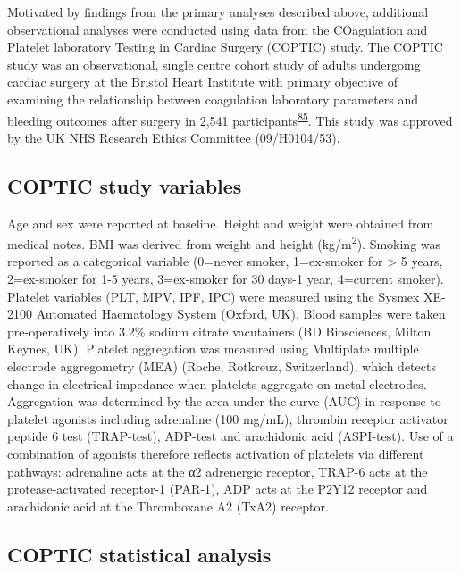 \documentclass[11pt,twoside]{bristolthesis}
\begin{document}
Motivated by findings from the primary analyses described above, additional observational analyses were conducted using data from the COagulation and Platelet laboratory Testing in Cardiac Surgery (COPTIC) study. The COPTIC study was an observational, single centre cohort study of adults undergoing cardiac surgery at the Bristol Heart Institute with primary objective of examining the relationship between coagulation laboratory parameters and bleeding outcomes after surgery in 2,541 participants\textsuperscript{\protect\hyperlink{ref-Mumford2017}{85}}. This study was approved by the UK NHS Research Ethics Committee (09/H0104/53).

\hypertarget{coptic-study-variables}{%
\subsection{COPTIC study variables}\label{coptic-study-variables}}

Age and sex were reported at baseline. Height and weight were obtained from medical notes. BMI was derived from weight and height (kg/m\textsuperscript{2}). Smoking was reported as a categorical variable (0=never smoker, 1=ex-smoker for \textgreater{} 5 years, 2=ex-smoker for 1-5 years, 3=ex-smoker for 30 days-1 year, 4=current smoker). Platelet variables (PLT, MPV, IPF, IPC) were measured using the Sysmex XE-2100 Automated Haematology System (Oxford, UK). Blood samples were taken pre-operatively into 3.2\% sodium citrate vacutainers (BD Biosciences, Milton Keynes, UK). Platelet aggregation was measured using Multiplate multiple electrode aggregometry (MEA) (Roche, Rotkreuz, Switzerland), which detects change in electrical impedance when platelets aggregate on metal electrodes. Aggregation was determined by the area under the curve (AUC) in response to platelet agonists including adrenaline (100 mg/mL), thrombin receptor activator peptide 6 test (TRAP-test), ADP-test and arachidonic acid (ASPI-test). Use of a combination of agonists therefore reflects activation of platelets via different pathways: adrenaline acts at the α2 adrenergic receptor, TRAP-6 acts at the protease-activated receptor-1 (PAR-1), ADP acts at the P2Y12 receptor and arachidonic acid at the Thromboxane A2 (TxA2) receptor.

\hypertarget{coptic-statistical-analysis}{%
\subsection{COPTIC statistical analysis}\label{coptic-statistical-analysis}}
\end{document}
